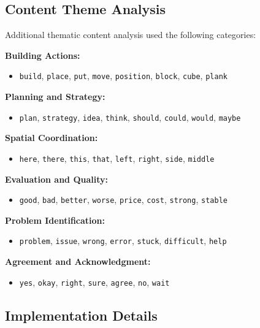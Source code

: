\subsection{Content Theme Analysis}

Additional thematic content analysis used the following categories:

\textbf{Building Actions:}
\begin{itemize}
\item \texttt{build}, \texttt{place}, \texttt{put}, \texttt{move}, \texttt{position}, \texttt{block}, \texttt{cube}, \texttt{plank}
\end{itemize}

\textbf{Planning and Strategy:}
\begin{itemize}
\item \texttt{plan}, \texttt{strategy}, \texttt{idea}, \texttt{think}, \texttt{should}, \texttt{could}, \texttt{would}, \texttt{maybe}
\end{itemize}

\textbf{Spatial Coordination:}
\begin{itemize}
\item \texttt{here}, \texttt{there}, \texttt{this}, \texttt{that}, \texttt{left}, \texttt{right}, \texttt{side}, \texttt{middle}
\end{itemize}

\textbf{Evaluation and Quality:}
\begin{itemize}
\item \texttt{good}, \texttt{bad}, \texttt{better}, \texttt{worse}, \texttt{price}, \texttt{cost}, \texttt{strong}, \texttt{stable}
\end{itemize}

\textbf{Problem Identification:}
\begin{itemize}
\item \texttt{problem}, \texttt{issue}, \texttt{wrong}, \texttt{error}, \texttt{stuck}, \texttt{difficult}, \texttt{help}
\end{itemize}

\textbf{Agreement and Acknowledgment:}
\begin{itemize}
\item \texttt{yes}, \texttt{okay}, \texttt{right}, \texttt{sure}, \texttt{agree}, \texttt{no}, \texttt{wait}
\end{itemize}

\subsection{Implementation Details}

